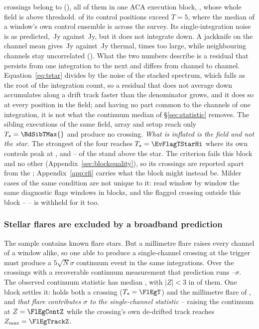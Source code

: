 \BdNCross{} crossings belong to \BdStar{} (\BdAlias), all of them in one
ACA execution block, \texttt{\BdBlock}, whose whole field is above threshold.
\BdNCtrlAbove{} of its \BdNCtrl{} control positions exceed $T=5$, where the
median of a window's own control ensemble is \BdSurvCtrlMed{} across the
survey. Its single-integration noise is as predicted, \BdRmsMeas\,Jy against
\BdRmsPred\,Jy, but it does not integrate down. A jackknife on the channel
mean gives \BdJack\,Jy against \BdThermal\,Jy thermal, \BdJackRatio{} times
too large, while neighbouring channels stay uncorrelated (\BdChanCorr). What the two numbers describe is a
residual that persists from one integration to the next and differs from
channel to channel. Equation~\ref{eq:tstar} divides by the noise of the
stacked spectrum, which falls as the root of the integration count, so a
residual that does not average down accumulates along a drift track faster
than the denominator grows, and it does so at every position in the field; and
having no part common to the channels of one integration, it is not what the
continuum median of \S\ref{sec:statistic} removes. The \BdNSibling{}
sibling executions of the same field, array and setup reach only
$T_\star=\BdSibTMax{}$ and produce no crossing. \emph{What is inflated is the field and not the star.} The strongest of the
four reaches $T_\star=\EvFlagTStarHi$ where its own controls peak at
\EvFlagCtrlAtHi, and \EvFlagNgeLo--\EvFlagNgeHi{} of the \BdNCtrl{} stand
above the star. The
criterion fails this block and no other
(Appendix~\ref{sec:blockquality}), so its \BdNCross{} crossings are reported
apart from the \EvNCrossQp{}; Appendix~\ref{app:rfi} carries what the block
might instead be. Milder cases of the same condition are not unique to it:
read window by window the same diagnostic flags \DqNWin{} windows in
\BkFlagNBlock{} blocks, and the \BkFlagNCrossOther{} flagged crossing outside
this block -- \BkFlagOtherStar{} -- is withheld for it too.

\subsubsection{Stellar flares are excluded by a broadband prediction}

The sample contains known flare stars. But a millimetre flare raises every
channel of a window alike, so one able to produce a single-channel crossing at
the trigger must produce a $5\sqrt{N}\sigma$ continuum event in the same
integrations. Over the \FlNCont{} crossings with a recoverable continuum measurement
that prediction runs \FlPredLo--\FlPredHi$\sigma$. The observed continuum
statistic has median \FlObsMed, with $|Z|<3$ in \FlNQuiet{} of them. One block settles it: \FlEgStar{} \texttt{\FlEgEb} holds both a
crossing ($T_\star=\FlEgT$) and the millimetre flare of
\citet{MacGregor2020}, and \emph{that flare contributes \FlEgContrib$\sigma$
to the single-channel statistic} -- raising the continuum at $Z=\FlEgContZ$
while the crossing's own de-drifted track reaches $Z_{\max}=\FlEgTrackZ$.

